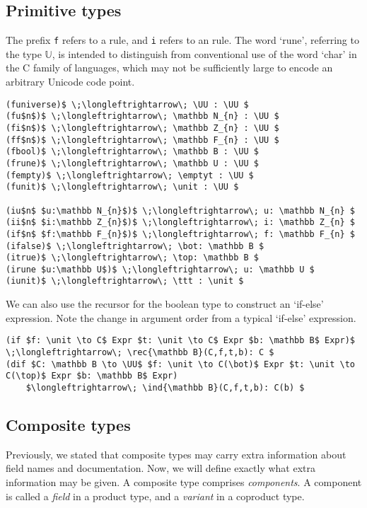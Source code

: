 \documentclass[11pt]{book}
\begin{document}
\subsection{Primitive types}
The prefix \lstinline{f} refers to a \rform{} rule, and \lstinline{i} refers to an \rintro{} rule.
The word `rune', referring to the type \( \mathbb U \), is intended to distinguish from conventional use of the word `char' in the C family of languages, which may not be sufficiently large to encode an arbitrary Unicode code point.
\begin{lstlisting}[mathescape=true]
(funiverse)$ \;\longleftrightarrow\; \UU : \UU $
(fu$n$)$ \;\longleftrightarrow\; \mathbb N_{n} : \UU $
(fi$n$)$ \;\longleftrightarrow\; \mathbb Z_{n} : \UU $
(ff$n$)$ \;\longleftrightarrow\; \mathbb F_{n} : \UU $
(fbool)$ \;\longleftrightarrow\; \mathbb B : \UU $
(frune)$ \;\longleftrightarrow\; \mathbb U : \UU $
(fempty)$ \;\longleftrightarrow\; \emptyt : \UU $
(funit)$ \;\longleftrightarrow\; \unit : \UU $

(iu$n$ $u:\mathbb N_{n}$)$ \;\longleftrightarrow\; u: \mathbb N_{n} $
(ii$n$ $i:\mathbb Z_{n}$)$ \;\longleftrightarrow\; i: \mathbb Z_{n} $
(if$n$ $f:\mathbb F_{n}$)$ \;\longleftrightarrow\; f: \mathbb F_{n} $
(ifalse)$ \;\longleftrightarrow\; \bot: \mathbb B $
(itrue)$ \;\longleftrightarrow\; \top: \mathbb B $
(irune $u:\mathbb U$)$ \;\longleftrightarrow\; u: \mathbb U $
(iunit)$ \;\longleftrightarrow\; \ttt : \unit $
\end{lstlisting}
We can also use the recursor for the boolean type to construct an `if-else' expression.
Note the change in argument order from a typical `if-else' expression.
\begin{lstlisting}[mathescape=true]
(if $f: \unit \to C$ Expr $t: \unit \to C$ Expr $b: \mathbb B$ Expr)$ \;\longleftrightarrow\; \rec{\mathbb B}(C,f,t,b): C $
(dif $C: \mathbb B \to \UU$ $f: \unit \to C(\bot)$ Expr $t: \unit \to C(\top)$ Expr $b: \mathbb B$ Expr)
    $\longleftrightarrow\; \ind{\mathbb B}(C,f,t,b): C(b) $
\end{lstlisting}

\subsection{Composite types}
Previously, we stated that composite types may carry extra information about field names and documentation.
Now, we will define exactly what extra information may be given.
A composite type comprises \textit{components}.
A component is called a \textit{field} in a product type, and a \textit{variant} in a coproduct type.
\end{document}
